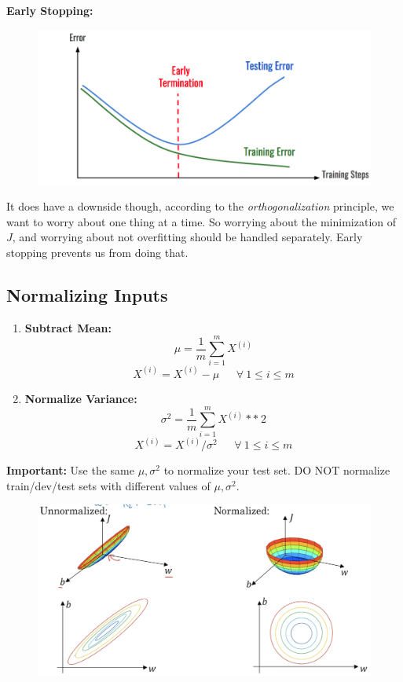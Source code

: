 \textbf{Early Stopping:} 
\begin{figure}[H]
    \includegraphics[scale=0.35]{images/earlystop.png}
    \centering
\end{figure}

It does have a downside though, according to the \emph{orthogonalization} principle, we want to worry about one thing at a time. So worrying about the minimization of $J$, and worrying about not overfitting should be handled separately. Early stopping prevents us from doing that. 

\subsection{Normalizing Inputs}

\begin{enumerate}
    \item \textbf{Subtract Mean:}
    $$
    \mu = \frac{1}{m}\sum_{i=1}^{m} X^{(i)}
    $$
    $$
    X^{(i)} = X^{(i)} - \mu\ \ \ \ \ \ \ \forall\ 1 \leq i \leq m
    $$
    \item \textbf{Normalize Variance:}
    $$
    \sigma^2 = \frac{1}{m}\sum_{i=1}^{m} X^{(i)}\ast\ast\ 2
    $$
    $$
    X^{(i)} = X^{(i)} / \sigma^2\ \ \ \ \ \ \ \forall\ 1 \leq i \leq m
    $$
\end{enumerate}

\textbf{Important:} Use the same $\mu, \sigma^2$ to normalize your test set. DO NOT normalize train/dev/test sets with different values of $\mu, \sigma^2$.

\begin{figure}[H]
    \includegraphics[scale=0.35]{images/normalize.png}
    \centering
\end{figure}


